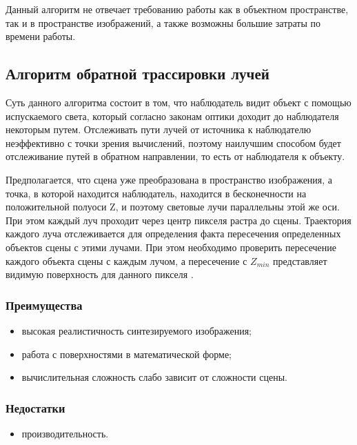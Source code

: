 Данный алгоритм не отвечает требованию работы как в объектном пространстве, так и в пространстве изображений, а также возможны большие затраты по времени работы.


\subsection{Алгоритм обратной трассировки лучей}

Суть данного алгоритма состоит в том, что наблюдатель видит объект с помощью испускаемого света, который согласно законам оптики доходит до наблюдателя некоторым путем. Отслеживать пути лучей от источника к наблюдателю неэффективно с точки зрения вычислений, поэтому наилучшим способом будет отслеживание путей в обратном направлении, то есть от наблюдателя к объекту.

Предполагается, что сцена уже преобразована в пространство изображения, а точка, в которой находится наблюдатель, находится в бесконечности на положительной полуоси Z, и поэтому световые лучи параллельны этой же оси. При этом каждый луч проходит через центр пикселя растра до сцены. Траектория каждого луча отслеживается для определения факта пересечения определенных объектов сцены с этими лучами. При этом необходимо проверить пересечение каждого объекта сцены с каждым лучом, а пересечение с $Z_{min}$  представляет видимую поверхность для данного пикселя \cite{raytrace}.
 

\subsubsection*{Преимущества}
\begin{itemize}
	\item	высокая реалистичность синтезируемого изображения;
	\item	работа с поверхностями в математической форме;
	\item	вычислительная сложность слабо зависит от сложности сцены.
\end{itemize}

\subsubsection*{Недостатки}
\begin{itemize}
	\item	производительность.
\end{itemize}

